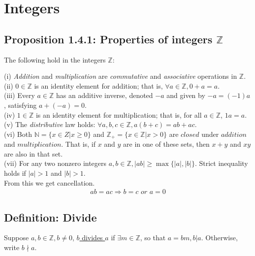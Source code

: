 \documentclass[11pt]{elegantbook}
\begin{document}
\chapter{Integers}
\section{Proposition 1.4.1: Properties of integers $\mathbb{Z}$}
\begin{proposition}[Proposition 1.4.1.]
    The following hold in the integers $\mathbb{Z}$:
\end{proposition}
(i) \textit{Addition} and \textit{multiplication} are \textit{commutative} and \textit{associative} operations in $\mathbb{Z}$.\\
(ii) $0 \in \mathbb{Z}$ is an identity element for addition; that is, $\forall a \in \mathbb{Z}, 0 + a = a$.\\
(iii) Every $a \in \mathbb{Z}$ has an additive inverse, denoted $-a$ and given by $-a = (-1)a$, satisfying $a + (-a) = 0$.\\
(iv) $1 \in \mathbb{Z}$ is an identity element for multiplication; that is, for all $a \in \mathbb{Z}$, $1a = a.$\\
(v) The \textit{distributive} law holds: $\forall a,b,c \in \mathbb{Z}, a(b + c) = ab + ac$.\\
(vi) Both $\mathbb{N} = \{x \in Z | x \geq 0\}$ and $\mathbb{Z}_+ = \{x \in \mathbb{Z} | x > 0\}$ are $closed$ under $addition$ and $multiplication$.
That is, if $x$ and $y$ are in one of these sets, then $x + y$ and $xy$ are also in that set.\\
(vii) For any two nonzero integers $a,b\in\mathbb{Z}, |ab|\geq \max\{|a|,|b|\}$. Strict inequality holds if $|a| > 1$ and $|b| > 1$.\\

From this we get cancellation.
\begin{equation}
    \begin{aligned}
        ab=ac \Rightarrow	b=c \textit{ or } a=0
    \end{aligned}
    \nonumber
\end{equation}

\section{Definition: Divide}
Suppose $a,b\in\mathbb{Z},b\neq 0$, \underline{$b$ divides $a$} if $\exists m\in\mathbb{Z}$, so that $a=bm, b|a$. Otherwise, write $b \nmid a$.
\end{document}
